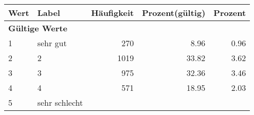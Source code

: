      \begin{longtable}{lXrrr}
     \toprule
     \textbf{Wert} & \textbf{Label} & \textbf{Häufigkeit} & \textbf{Prozent(gültig)} & \textbf{Prozent} \\
     \endhead
     \midrule
     \multicolumn{5}{l}{\textbf{Gültige Werte}}\\

     1 &
     \multicolumn{1}{X}{ sehr gut   } &


       \num{270} &
       \num[round-mode=places,round-precision=2]{8,96} &
         \num[round-mode=places,round-precision=2]{0,96} \\

     2 &
     \multicolumn{1}{X}{ 2   } &


       \num{1019} &
       \num[round-mode=places,round-precision=2]{33,82} &
         \num[round-mode=places,round-precision=2]{3,62} \\

     3 &
     \multicolumn{1}{X}{ 3   } &


       \num{975} &
       \num[round-mode=places,round-precision=2]{32,36} &
         \num[round-mode=places,round-precision=2]{3,46} \\

     4 &
     \multicolumn{1}{X}{ 4   } &


       \num{571} &
       \num[round-mode=places,round-precision=2]{18,95} &
         \num[round-mode=places,round-precision=2]{2,03} \\

     5 &
     \multicolumn{1}{X}{ sehr schlecht   } &



\end{longtable}
